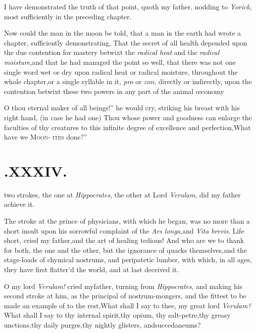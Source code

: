 \documentclass[twoside]{article}
\begin{document}
I have demonstrated the truth of that point, quoth my father,
nodding to \textit{Yorick}, most sufficiently in the preceding
chapter.

Now could the man in the moon be told, that a man in the earth
had wrote a chapter, sufficiently demonstrating, That the secret of
all health depended upon the due contention for mastery betwixt the
\textit{radical heat} and the \textit{radical moisture},\tsk and that
he had managed the point so well, that there was not one single
word wet or dry upon radical heat or radical moisture, throughout
the whole chapter,\tsk or a single syllable in it, \textit{pro} or
\textit{con}, directly or indirectly, upon the contention betwixt
these two powers in any part of the animal
œconomy\tsh

\indent\lqq O thou eternal maker of all
beings!”\break
\tsk he would cry, striking his breast with
his right hand, (in case he had one)\tsk{}
\lqq Thou whose power and goodness can\break
\lqq enlarge the faculties of thy creatures to\break
\lqq this infinite degree of excellence and\break
\lqq perfection,\tsk What have we \textsc{Moon}-\break
\lqq \textsc{ites} done?”

\section{.\enspace  XXXIV.}

 two strokes, the one at\break
\textit{Hippocrates}, the other at Lord\break
\textit{Verulam}, did my father achieve it.

The stroke at the prince of physicians, with which he began, was
no more than a short insult upon his sorrowful complaint of the
\textit{Ars longa},\tsk and \textit{Vita brevis}.\break
\tsh Life short, cried my father,\tsk and the art of healing tedious! And
who are we to thank for both, the one and the other, but the
ignorance of quacks themselves,\tsk and the stage-loads of
chymical nostrums, and peripatetic lumber, with which, in all
ages, they have first flatter’d the world, and at last
deceived it.

\tsh  O my lord \textit{Verulam!} cried my\break father,
turning from \textit{Hippocrates}, and\break
making his second stroke at him, as the principal of nostrum-mongers, and the
fittest to be made an example of to the rest,\tsh What shall I say to thee, my great
lord \textit{Verulam?} What shall I say to thy internal spirit,\tsk thy opium,\tsk
thy salt-petre,\tsh thy greasy unctions,\tsk thy daily purges,\tsk thy nightly
glisters, and\break succedaneums?
\end{document}
